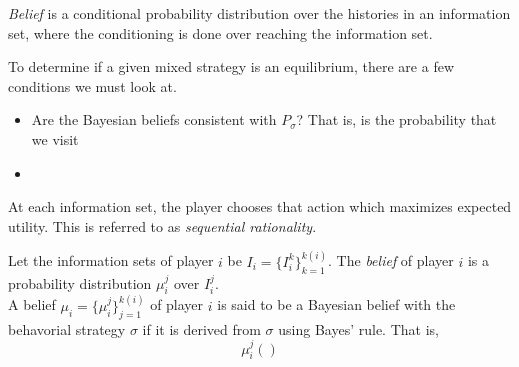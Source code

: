 	\begin{definition}
		\emph{Belief} is a conditional probability distribution over the histories in an information set, where the conditioning is done over reaching the information set.
	\end{definition}

	To determine if a given mixed strategy is an equilibrium, there are a few conditions we must look at.
	\begin{itemize}
		\item Are the Bayesian beliefs consistent with $P_\sigma$? That is, is the probability that we visit 
		\item 
	\end{itemize}

	At each information set, the player chooses that action which maximizes expected utility. This is referred to as \emph{sequential rationality}.

	\begin{fdef}
		Let the information sets of player $i$ be $I_i = \{ I_i^k \}_{k=1}^{k(i)}$. The \emph{belief} of player $i$ is a probability distribution $\mu_i^j$ over $I_i^j$.\\
		A belief $\mu_i = \{\mu_i^j\}_{j=1}^{k(i)}$ of player $i$ is said to be a Bayesian belief with the behavorial strategy $\sigma$ if it is derived from $\sigma$ using Bayes' rule. That is,
		\[ \mu_i^j() \]
	\end{fdef}